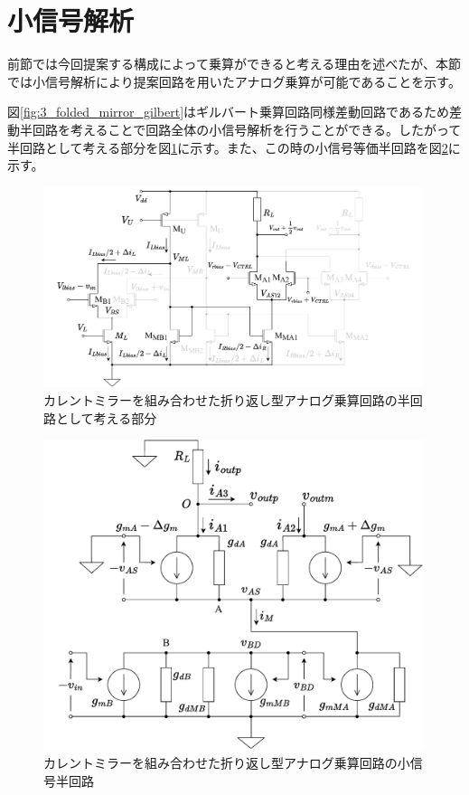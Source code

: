     \section{小信号解析}
        前節では今回提案する構成によって乗算ができると考える理由を述べたが、本節では小信号解析により提案回路を用いたアナログ乗算が可能であることを示す。\par
        図\ref{fig:3_folded_mirror_gilbert}はギルバート乗算回路同様差動回路であるため差動半回路を考えることで回路全体の小信号解析を行うことができる。したがって半回路として考える部分を図\ref{fig:3_folded_mirror_gilbert_half}に示す。また、この時の小信号等価半回路を図\ref{fig:3_folded_mirror_half}に示す。
        \begin{figure}[!b]
            \centering
            \includegraphics[width=0.99\textwidth]{figures/chapter3/NtoNFolded_half.pdf}
            \caption{カレントミラーを組み合わせた折り返し型アナログ乗算回路の半回路として考える部分}
            \label{fig:3_folded_mirror_gilbert_half}
        \end{figure}
        \begin{figure}[!b]
            \centering
            \includegraphics[width=0.99\textwidth]{figures/chapter3/NtoNHalfDiffEqual.pdf}
            \caption{カレントミラーを組み合わせた折り返し型アナログ乗算回路の小信号半回路}
            \label{fig:3_folded_mirror_half}
        \end{figure}
